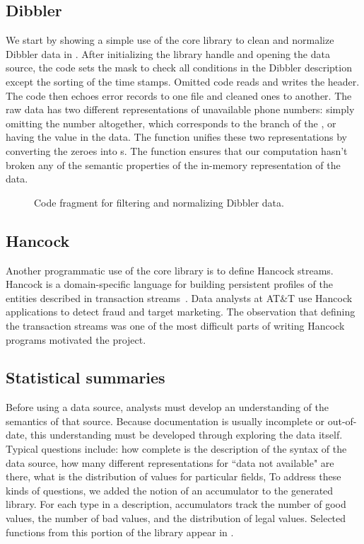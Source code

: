 \documentclass{sig-alternate}
\begin{document}
\subsection{Dibbler}
\label{subsec:general}
We start by showing a simple use of 
the core library to clean and normalize Dibbler data
in . After initializing
the \pads{} library handle and opening the data source, the code sets
the mask to check all conditions in the Dibbler description except the
sorting of the time stamps.  Omitted code reads and writes the header. 
The code then echoes error records to one file and cleaned ones to another.
The raw data has two different representations of unavailable phone numbers:
simply omitting the number altogether, which corresponds to the 
branch of the , or having the value  in the data.  
The function  unifies these two representations 
by converting the zeroes into s.  The function 
ensures that our computation hasn't broken any of the semantic properties
of the in-memory representation of the data.
\begin{figure*}
\begin{small}
\begin{center}

\label{figure:dibbler-filter}
\caption{Code fragment for filtering and normalizing Dibbler data.}
\end{center}
\end{small}
\end{figure*}

\subsection{Hancock}
Another programmatic use of the core library is to define  
Hancock streams.  Hancock is a domain-specific language for
building persistent profiles of the entities described in transaction 
streams~\cite{hancock-toplas}.  Data analysts at AT\&T use Hancock 
applications to detect fraud and target marketing. 
The observation that defining the transaction
streams was one of the most difficult parts of writing Hancock programs
motivated the \pads{} project. 


\subsection{Statistical summaries}
Before using a data source, analysts must develop an understanding 
of the semantics of that source.  Because documentation is usually
incomplete or out-of-date, this understanding must be developed 
through exploring the data itself.  Typical questions include:
how complete is the description of the syntax of the data source,
how many different representations for ``data not available" are there,
what is the distribution of values for particular fields, \etc{}
To address these kinds of questions, we added the notion of an accumulator
to the generated library.  For each type in a \pads{} description, accumulators track the number of good values, the number of bad values, and the 
distribution of legal values.  Selected functions from this portion of the library appear in .  
\end{document}
